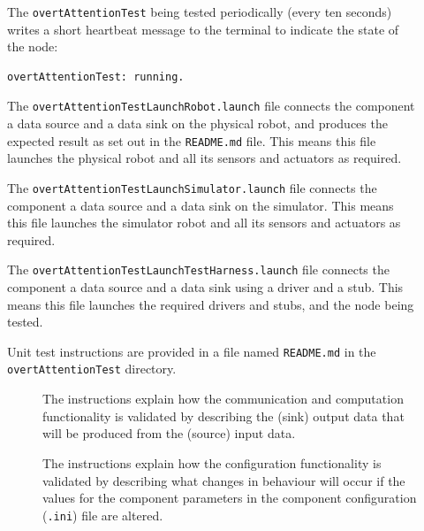 \documentclass{CSSRforAfrica}
\newcommand{\checkboxChecked}{\fbox{\ding{51}}} %
\newcommand{\checkboxDashed}{\fbox{--}}         %
\begin{document}
\begin{description}
\item[\checkboxChecked]  The {\small \verb+overtAttentionTest+} being tested periodically (every ten seconds) writes a short heartbeat message to
 the terminal to indicate the state of the node:
\begin{verbatim}
overtAttentionTest: running.
\end{verbatim}

\item[\checkboxChecked] The {\small \verb+overtAttentionTestLaunchRobot.launch+} file  connects the component a data source and a data sink on the physical robot, and produces the expected result as set out in the  {\small \verb+README.md+}  file.    This means this file launches the physical robot and all its sensors and actuators as required.

\item[\checkboxDashed] The {\small \verb+overtAttentionTestLaunchSimulator.launch+} file  connects the component a data source and a data sink on the simulator.   This means this file launches the simulator robot and all its sensors and actuators as required.

\item[\checkboxChecked] The {\small \verb+overtAttentionTestLaunchTestHarness.launch+} file  connects the component a data source and a data sink using a driver and a stub.   This means this file launches the required drivers and stubs, and the node being tested.

\item[\checkboxChecked] Unit test instructions are provided in a file named {\small \verb+README.md+} in the  {\small \verb+overtAttentionTest+} directory. 


\begin{description}

\item[\checkboxChecked] The instructions explain how the communication and computation functionality is validated by describing the (sink) output data that will be produced from the (source) input data.  

\item[\checkboxChecked] The instructions explain how the configuration functionality is validated by describing what changes in behaviour will occur if the values for the component parameters in the component configuration ({\small \verb+.ini+}) file are altered.

\end{description}
\end{description}
\newpage
\end{document}
